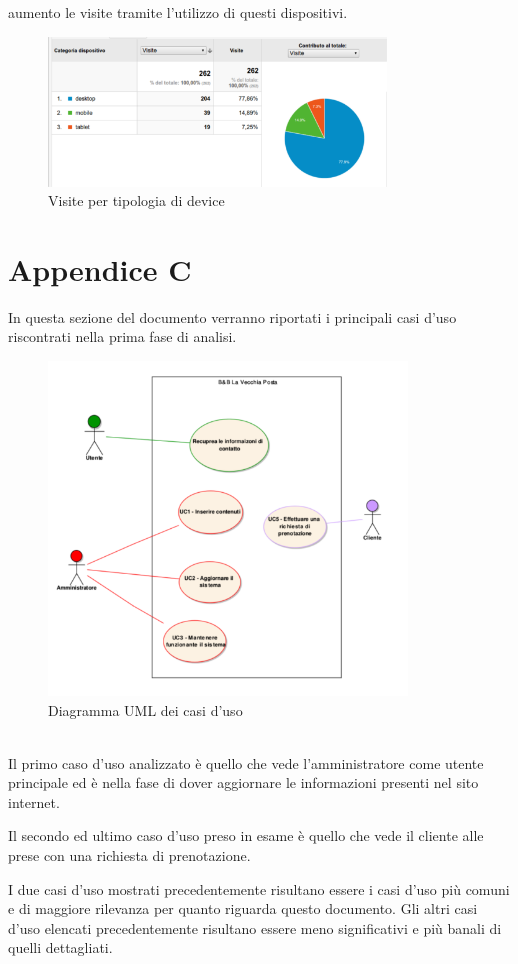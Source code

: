 \documentclass[a4paper,12pt,hidelinks]{report}
\begin{document}
  aumento le visite tramite l'utilizzo di questi dispositivi.
  \begin{figure}[h!]%
    \includegraphics[width=0.80\textwidth,keepaspectratio=true]{img/googleTecnologia}
    \centering
    \caption{Visite per tipologia di device}%
    \label{fig:googleTecnologia}%
  \end{figure}
  
\newpage
\section{Appendice C}
In questa sezione del documento verranno riportati i principali casi d'uso riscontrati nella prima fase di analisi.
\begin{figure}[h!]%
    \includegraphics[width=0.85\textwidth,keepaspectratio=true]{img/useCase}
    \centering
    \caption{Diagramma UML dei casi d'uso}%
    \label{fig:useCase}%
  \end{figure}
\\Il primo caso d'uso analizzato è quello che vede l'amministratore come utente principale ed è nella fase di dover aggiornare le informazioni presenti nel sito internet.
  
Il secondo ed ultimo caso d'uso preso in esame è quello che vede il cliente alle prese con una richiesta di prenotazione.
  
\par I due casi d'uso mostrati precedentemente risultano essere i casi d'uso più comuni e di maggiore rilevanza per quanto riguarda questo documento. Gli altri casi d'uso 
elencati precedentemente risultano essere meno significativi e più banali di quelli dettagliati.
\end{document}
